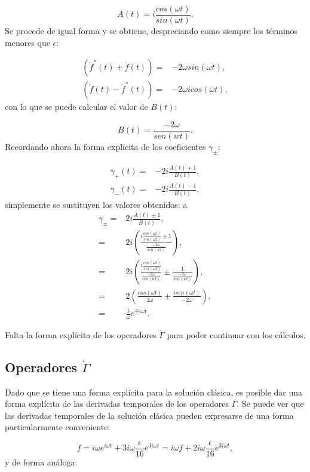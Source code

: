 \documentclass[a4paper,10pt]{report}
\begin{document}
\begin{equation}
A(t) = i \frac{cos(\omega t)}{sin(\omega t)}.
\end{equation} Se procede de igual forma y se obtiene, despreciando como siempre los términos menores que $\epsilon$:

\begin{align*}
(\dot{f}^* (t) + \dot{f}(t))=&-2\omega sin(\omega t),\\
(\dot{f} (t) - \dot{f}^*(t))=&-2\omega i cos(\omega t),
\end{align*} con lo que se puede calcular el valor de $B(t)$:

\begin{equation}
B(t) = \frac{-2\omega }{sen(wt)}.
\end{equation} Recordando ahora la forma explícita de los coeficientes $\gamma_{\pm}$:

\begin{align*}
\gamma_+(t)=&-2i\frac{A(t) +1}{B(t)},\\
\gamma_-(t)=&-2i\frac{A(t) -1}{B(t)},
\end{align*} simplemente se sustituyen los valores obtenidos:
a
\begin{align}
\gamma_\pm =& 2i\frac{A(t) \pm 1}{B(t)},\\
=& 2i(\frac{i \frac{cos(\omega t)}{sin(\omega t)}\pm 1}{\frac{-2\omega }{sen(wt)}}), \\
=& 2i(\frac{i \frac{cos(\omega t)}{sin(\omega t)}}{\frac{-2\omega }{sen(wt)}} \pm \frac{1}{\frac{-2\omega }{sen(wt)}}), \\
=& 2(\frac{cos(\omega t)}{2\omega} \pm \frac{i sen(\omega t)}{-2\omega}),\\
=& \frac{1}{\omega}e^{\mp i\omega t}.
\end{align}

Falta la forma explícita de los operadores $\dot{\Gamma}$ para poder continuar con los cálculos.

\subsection{Operadores $\dot{\Gamma}$}

Dado que se tiene una forma explícita para la solución clásica, es posible dar una forma explícita de las derivadas temporales de los operadores $\Gamma$. Se puede ver que las derivadas temporales de la solución clásica pueden expresarse de una forma particularmente conveniente:

\begin{equation}
\dot{f} = i\omega e^{i \omega t} + 3i\omega\frac{\epsilon}{16} e^{3i\omega t}= i\omega f + 2i\omega \frac{\epsilon}{16} e^{3i\omega t},
\end{equation} y de forma análoga:
\end{document}
